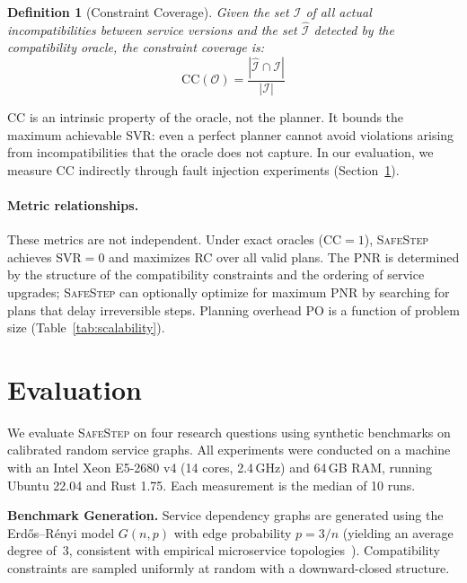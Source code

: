 \documentclass[10pt,twocolumn]{article}
\newtheorem{definition}{Definition}
\newcommand{\safestep}{\textsc{SafeStep}}
\begin{document}
\begin{definition}[Constraint Coverage]
Given the set $\mathcal{I}$ of all actual incompatibilities
between service versions and the set $\hat{\mathcal{I}}$
detected by the compatibility oracle, the \emph{constraint
coverage} is:
\[
  \mathrm{CC}(\mathcal{O}) = \frac{|\hat{\mathcal{I}} \cap
  \mathcal{I}|}{|\mathcal{I}|}
\]
\end{definition}

CC is an intrinsic property of the oracle, not the planner.
It bounds the maximum achievable SVR: even a perfect planner
cannot avoid violations arising from incompatibilities that the
oracle does not capture. In our evaluation, we measure CC
indirectly through fault injection experiments (Section~\ref{sec:eval}).

\paragraph{Metric relationships.}
These metrics are not independent. Under exact oracles
($\mathrm{CC} = 1$), \safestep{} achieves $\mathrm{SVR} = 0$
and maximizes RC over all valid plans. The PNR is determined by
the structure of the compatibility constraints and the ordering
of service upgrades; \safestep{} can optionally optimize for
maximum PNR by searching for plans that delay irreversible
steps. Planning overhead PO is a function of problem size
(Table~\ref{tab:scalability}).

\section{Evaluation}
\label{sec:eval}

We evaluate \safestep{} on four research questions using
synthetic benchmarks on calibrated random service graphs.
All experiments were conducted on a machine with an Intel
Xeon E5-2680 v4 (14 cores, 2.4\,GHz) and 64\,GB RAM,
running Ubuntu 22.04 and Rust 1.75. Each measurement is
the median of 10 runs.

\textbf{Benchmark Generation.}
Service dependency graphs are generated using the
Erd\H{o}s--R\'enyi model $G(n, p)$ with edge probability
$p = 3/n$ (yielding an average degree of~3, consistent
with empirical microservice topologies~\cite{zhou-microservices-2018}).
Compatibility constraints are sampled uniformly at random
with a downward-closed structure.
\end{document}
